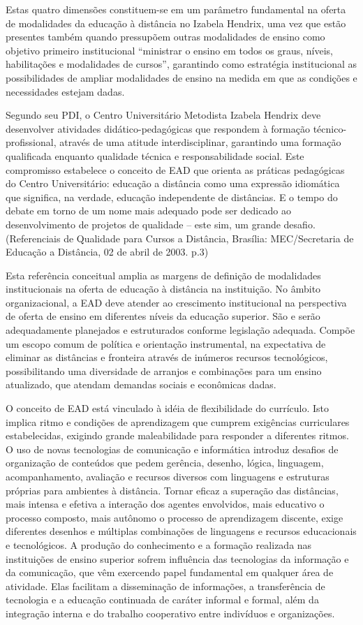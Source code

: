 \documentclass[a4paper, 12pt, openright, oneside, german, french, english, brazil]{abntex2}
\begin{document}
Estas quatro dimensões constituem-se em um parâmetro fundamental na oferta de modalidades da educação à distância no Izabela Hendrix, uma vez que estão presentes também quando pressupõem outras modalidades de ensino como objetivo primeiro institucional “ministrar o ensino em todos os graus, níveis, habilitações e modalidades de cursos”, garantindo como estratégia institucional as possibilidades de ampliar modalidades de ensino na medida em que as condições e necessidades estejam dadas.

Segundo seu PDI, o Centro Universitário Metodista Izabela Hendrix deve desenvolver atividades didático-pedagógicas que respondem à formação técnico-profissional, através de uma atitude interdisciplinar, garantindo uma formação qualificada enquanto qualidade técnica e responsabilidade social. Este compromisso estabelece o conceito de EAD que orienta as práticas pedagógicas do Centro Universitário: educação a distância como uma expressão idiomática que significa, na verdade, educação independente de distâncias. E o tempo do debate em torno de um nome mais adequado pode ser dedicado ao desenvolvimento de projetos de qualidade – este sim, um grande desafio. (Referenciais de Qualidade para Cursos a Distância, Brasília: MEC/Secretaria de Educação a Distância, 02 de abril de 2003. p.3)

Esta referência conceitual amplia as margens de definição de modalidades institucionais na oferta de educação à distância na instituição. No âmbito organizacional, a EAD deve atender ao crescimento institucional na perspectiva de oferta de ensino em diferentes níveis da educação superior. São e serão adequadamente planejados e estruturados conforme legislação adequada. Compõe um escopo comum de política e orientação instrumental, na expectativa de eliminar as distâncias e fronteira através de inúmeros recursos tecnológicos, possibilitando uma diversidade de arranjos e combinações para um ensino atualizado, que atendam demandas sociais e econômicas dadas.

O conceito de EAD está vinculado à idéia de flexibilidade do currículo. Isto implica ritmo e condições de aprendizagem que cumprem exigências curriculares estabelecidas, exigindo grande maleabilidade para responder a diferentes ritmos. O uso de novas tecnologias de comunicação e informática introduz desafios de organização de conteúdos que pedem gerência, desenho, lógica, linguagem, acompanhamento, avaliação e recursos diversos com linguagens e estruturas próprias para ambientes à distância. Tornar eficaz a superação das distâncias, mais intensa e efetiva a interação dos agentes envolvidos, mais educativo o processo composto, mais autônomo o processo de aprendizagem discente, exige diferentes desenhos e múltiplas combinações de linguagens e recursos educacionais e tecnológicos. A produção do conhecimento e a formação realizada nas instituições de ensino superior sofrem influência das tecnologias da informação e da comunicação, que vêm exercendo papel fundamental em qualquer área de atividade. Elas facilitam a disseminação de informações, a transferência de tecnologia e a educação continuada de caráter informal e formal, além da integração interna e do trabalho cooperativo entre indivíduos e organizações.
\end{document}
